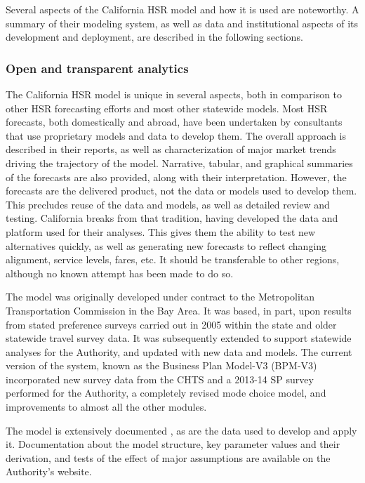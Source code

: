 Several aspects of the California HSR model and how it is used are noteworthy. A summary of their modeling system, as well as data and institutional aspects of its development and deployment, are described in the following sections.

\subsubsection{Open and transparent analytics}

The California HSR model is unique in several aspects, both in comparison to other HSR forecasting efforts and most other statewide models. Most HSR forecasts, both domestically and abroad, have been undertaken by consultants that use proprietary models and data to develop them. The overall approach is described in their reports, as well as characterization of major market trends driving the trajectory of the model. Narrative, tabular, and graphical summaries of the forecasts are also provided, along with their interpretation. However, the forecasts are the delivered product, not the data or models used to develop them. This precludes reuse of the data and models, as well as detailed review and testing. California breaks from that tradition, having developed the data and platform used for their analyses. This gives them the ability to test new alternatives quickly, as well as generating new forecasts to reflect changing alignment, service levels, fares, etc. It should be transferable to other regions, although no known attempt has been made to do so.

The model was originally developed under contract to the Metropolitan Transportation Commission in the Bay Area. It was based, in part, upon results from stated preference surveys carried out in 2005 within the state and older statewide travel survey data. It was subsequently extended to support statewide analyses for the Authority, and updated with new data and models. The current version of the system, known as the Business Plan Model-V3 (BPM-V3) incorporated new survey data from the CHTS and a 2013-14 SP survey performed for the Authority, a completely revised mode choice model, and improvements to almost all the other modules.

The model is extensively documented \citep{cambridge16-bpmv3}, as are the data used to develop and apply it. Documentation about the model structure, key parameter values and their derivation, and tests of the effect of major assumptions are available on the Authority's website.


